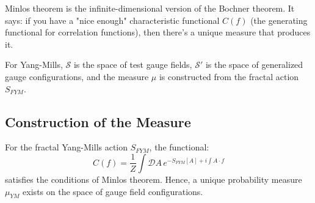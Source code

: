 \begin{intuitive}
Minlos theorem is the infinite-dimensional version of the Bochner theorem. It says: if you have a "nice enough" characteristic functional $C(f)$ (the generating functional for correlation functions), then there's a unique measure that produces it.

For Yang-Mills, $\mathcal{S}$ is the space of test gauge fields, $\mathcal{S}'$ is the space of generalized gauge configurations, and the measure $\mu$ is constructed from the fractal action $S_{FYM}$.
\end{intuitive}

\subsection{Construction of the Measure}

\begin{theorem}\label{thm:ym-measure-exists}
For the fractal Yang-Mills action $S_{FYM}$, the functional:
\begin{equation}
C(f) = \frac{1}{Z} \int \mathcal{D}A \, e^{-S_{FYM}[A] + i\int A \cdot f}
\end{equation}
satisfies the conditions of Minlos theorem. Hence, a unique probability measure $\mu_{YM}$ exists on the space of gauge field configurations.
\end{theorem}

